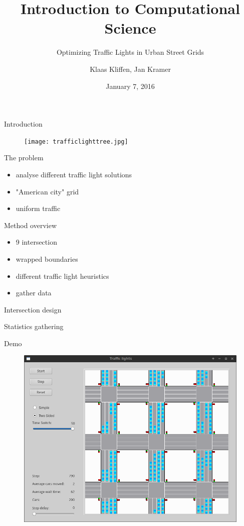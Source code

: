 \documentclass[11pt]{beamer}
\title{Introduction to Computational Science}
\subtitle{Optimizing Traffic Lights in Urban Street Grids}
\author{Klaas Kliffen, Jan Kramer}
\date{January 7, 2016}
\begin{document}
\maketitle

\begin{frame}{Introduction}
\begin{figure}
\centering
\texttt{[image: trafficlighttree.jpg]}
\end{figure}
\end{frame}

\begin{frame}{The problem}
\begin{itemize}
    \item analyse different traffic light solutions
    \item "American city" grid
    \item uniform traffic
\end{itemize}
\end{frame}

\begin{frame}{Method overview}
\begin{itemize}
    \item 9 intersection
    \item wrapped boundaries
    \item different traffic light heuristics
    \item gather data
\end{itemize}
\end{frame}

\begin{frame}{Intersection design}
\end{frame}

\begin{frame}{Statistics gathering}
    
\end{frame}

\begin{frame}{Demo}
\begin{figure}
\centering
\includegraphics[width=.8\textwidth]{vertical.png}
\end{figure}
\end{frame}
\end{document}
